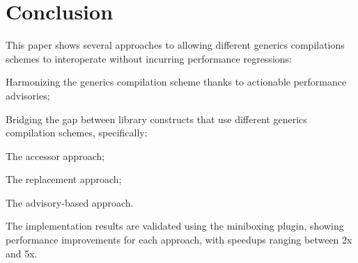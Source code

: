 \vspace{-1.0em}

\section{Conclusion}

\vspace{-0.5em}

This paper shows several approaches to allowing different generics compilations schemes to interoperate without incurring performance regressions:

\begin{compactitem}
\item Harmonizing the generics compilation scheme thanks to actionable performance advisories;
\item Bridging the gap between library constructs that use different generics compilation schemes, specifically:
  \begin{compactitem}
    \item The accessor approach;
    \item The replacement approach;
    \item The advisory-based approach.
  \end{compactitem}
\end{compactitem}

The implementation results are validated using the miniboxing plugin, showing performance improvements for each approach, with speedups ranging between 2x and 5x.

\vspace{-1.2em}
